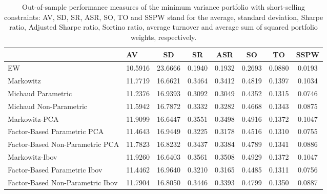 \begin{table}

\caption{\label{tab:empirical_mvp}Out-of-sample performance measures of the minimum variance portfolio with short-selling constraints: AV, SD, SR, ASR, SO, TO and SSPW stand for the average, standard deviation, Sharpe ratio, Adjusted Sharpe ratio, Sortino ratio, average turnover and average sum of squared portfolio weights, respectively.}
\centering
\begin{tabular}[t]{l|l|c|c|c|c|c|c}
\hline
  & AV & SD & SR & ASR & SO & TO & SSPW\\
\hline
EW & 10.5916 & 23.6666 & 0.1940 & 0.1932 & 0.2693 & 0.0880 & 0.0193\\
\hline
Markowitz & 11.7719 & 16.6621 & 0.3464 & 0.3412 & 0.4819 & 0.1397 & 0.1034\\
\hline
Michaud Parametric & 11.2376 & 16.9393 & 0.3092 & 0.3049 & 0.4352 & 0.1315 & 0.0746\\
\hline
Michaud Non-Parametric & 11.5942 & 16.7872 & 0.3332 & 0.3282 & 0.4668 & 0.1343 & 0.0875\\
\hline
Markowitz-PCA & 11.9099 & 16.6447 & 0.3551 & 0.3498 & 0.4916 & 0.1372 & 0.1047\\
\hline
Factor-Based Parametric PCA & 11.4643 & 16.9449 & 0.3225 & 0.3178 & 0.4516 & 0.1310 & 0.0755\\
\hline
Factor-Based Non-Parametric PCA & 11.7823 & 16.8232 & 0.3437 & 0.3384 & 0.4789 & 0.1341 & 0.0886\\
\hline
Markowitz-Ibov & 11.9260 & 16.6403 & 0.3561 & 0.3508 & 0.4929 & 0.1372 & 0.1047\\
\hline
Factor-Based Parametric Ibov & 11.4462 & 16.9640 & 0.3210 & 0.3165 & 0.4485 & 0.1311 & 0.0756\\
\hline
Factor-Based Non-Parametric Ibov & 11.7904 & 16.8050 & 0.3446 & 0.3393 & 0.4799 & 0.1350 & 0.0887\\
\hline
\end{tabular}
\end{table}
